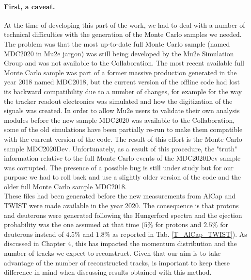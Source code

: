 \documentclass[12pt,a4paper,openright, oneside, titlepage]{book} %
\begin{document}
\paragraph{First, a caveat.} 
At the time of developing this part of the work, 
we had to deal with a number of
technical difficulties with the generation of the Monte Carlo samples
we needed. 
The problem was that
the most up-to-date full Monte Carlo sample (named MDC2020 in Mu2e jargon) 
was still being developed by the Mu2e Simulation Group
and was not available to the Collaboration. 
The most recent available full Monte Carlo sample 
was part of a former massive production generated in the year 2018 named MDC2018, 
but the current version of the offline code had lost its backward compatibility due to a number of changes, 
for example for the way the tracker readout electronics was simulated and how the digitization of the signals  was created. 
In order to allow Mu2e users to validate their own analysis modules before the new sample MDC2020 was available to the Collaboration, some of the old simulations have been partially re-run to make them compatible with the current version of the code. 
The result of this effort is the Monte Carlo sample MDC2020Dev.
Unfortunately, as a result of this procedure, the "truth" information relative to the full Monte Carlo events of the MDC2020Dev sample was corrupted. 
The presence of a possible bug is still under study but for our purpose we had to roll back and use a slightly older version of the code and the older full Monte Carlo sample MDC2018. \\
These files had been generated before the new measurements 
from AlCap and TWIST were made available in the year 2020. 
The consequence is that protons and deuterons were generated following the Hungerford spectra and the ejection probability was the one assumed at that time 
($5\%$ for protons and $2.5\%$ for deuterons instead of $4.5\%$ and $1.8\%$ as reported in Tab. \ref{T_AlCap_TWIST}). 
As discussed in Chapter 4, this has impacted the momentum distribution and the number of tracks we expect to reconstruct. 
Given that our aim is to take advantage of the number of reconstructed tracks, is important to keep these difference in mind when discussing results obtained with this method.
\end{document}
